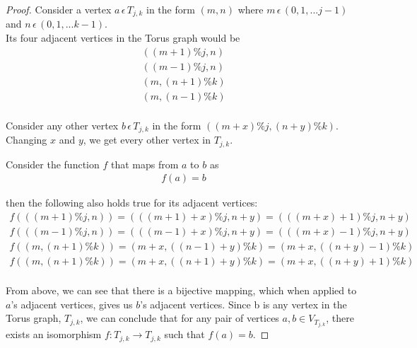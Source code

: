 \documentclass{article}
\begin{document}
\begin{proof}
    Consider a vertex $a \hspace{2pt} \epsilon \hspace{2pt} T_{j,k}$ in the form
    $(m,n)$ where $m \hspace{2pt} \epsilon \hspace{2pt} (0, 1, ... j-1)$ and $n \hspace{2pt} \epsilon \hspace{2pt} (0, 1, ... k-1)$. \\

    Its four adjacent vertices in the Torus graph would be
    \begin{align*}
        ((m+1)\%j, n) \\
        ((m-1)\%j, n) \\
        (m, (n+1)\%k) \\
        (m, (n-1)\%k) \\
    \end{align*}

    Consider any other vertex $b \hspace{2pt} \epsilon \hspace{2pt} T_{j,k}$ in the form $((m+x) \% j,(n+y) \% k)$. Changing $x$ and $y$, we get every other vertex in $T_{j,k}$.

    Consider the function $f$ that maps from $a$ to $b$ as 
    \begin{align*}
     f(a) = b
    \end{align*}

    then the following also holds true for its adjacent vertices:
    \begin{align*}
        f(((m+1)\%j, n)) = (((m+1)+x)\%j, n+y) = (((m+x)+1)\%j, n+y) \\
        f(((m-1)\%j, n)) = (((m-1)+x)\%j, n+y) = (((m+x)-1)\%j, n+y) \\
        f((m, (n+1)\%k)) = (m+x, ((n-1)+y)\%k) = (m+x, ((n+y)-1)\%k) \\
        f((m, (n+1)\%k)) = (m+x, ((n+1)+y)\%k) = (m+x, ((n+y)+1)\%k) \\
    \end{align*}

    From above, we can see that there is a bijective mapping, which when applied to $a$'s adjacent vertices, gives us $b$'s adjacent vertices. Since b is any vertex in the Torus graph, $T_{j,k}$, we can conclude that for any pair of vertices $a,b \in V_{T_{j,k}}$, there exists an isomorphism $f:T_{j,k} \to T_{j,k}$ such that $f(a) = b$.
\end{proof}
\end{document}
